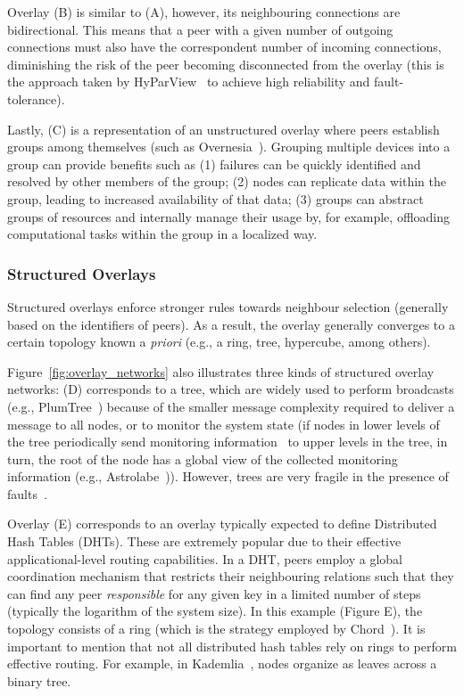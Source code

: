 Overlay (B) is similar to (A), however, its neighbouring connections are bidirectional. This means that a peer with a given number of outgoing connections must also have the correspondent number of incoming connections, diminishing the risk of the peer becoming disconnected from the overlay (this is the approach taken by HyParView~\cite{Hyparview} to achieve high reliability and fault-tolerance).

Lastly, (C) is a representation of an unstructured overlay where peers establish groups among themselves (such as Overnesia~\cite{leitao2014overnesia}). Grouping multiple devices into a group can provide benefits such as (1) failures can be quickly identified and resolved by other members of the group; (2) nodes can replicate data within the group, leading to increased availability of that data; (3) groups can abstract groups of resources and internally manage their usage by, for example, offloading computational tasks within the group in a localized way. 

\subsubsection*{Structured Overlays}

Structured overlays enforce stronger rules towards neighbour selection (generally based on the identifiers of peers). As a result, the overlay generally converges to a certain topology known a \textit{priori} (e.g., a ring, tree, hypercube, among others). 

Figure~\ref{fig:overlay_networks} also illustrates three kinds of structured overlay networks: (D) corresponds to a tree, which are widely used to perform broadcasts (e.g., PlumTree~\cite{plumTree}) because of the smaller message complexity required to deliver a message to all nodes, or to monitor the system state (if nodes in lower levels of the tree periodically send monitoring information~\cite{leitao2008large} to upper levels in the tree, in turn, the root of the node has a global view of the collected monitoring information (e.g., Astrolabe~\cite{Renesse2003})). However, trees are very fragile in the presence of faults~\cite{plumTree}.

Overlay (E) corresponds to an overlay typically expected to define Distributed Hash Tables (DHTs). These are extremely popular due to their effective applicational-level routing capabilities. In a DHT, peers employ a global coordination mechanism that restricts their neighbouring relations such that they can find any peer \textit{responsible} for any given key in a  limited number of steps (typically the logarithm of the system size). In this example (Figure E), the topology consists of a ring (which is the strategy employed by Chord~\cite{stoica2003chord}). It is important to mention that not all distributed hash tables rely on rings to perform effective routing. For example, in Kademlia~\cite{maymounkov2002kademlia}, nodes organize as leaves across a binary tree.

